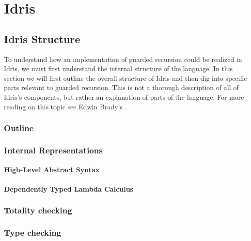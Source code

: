 \chapter{Idris}
\section{Idris Structure}
To understand how an implementation of guarded recursion could be realized in Idris, we must first understand the internal structure of the language. In this section we will first outline the overall structure of Idris and then dig into specific parts relevant to guarded recursion. This is not a thorough description of all of Idris's components, but rather an explanation of parts of the language. For more reading on this topic see Edwin Brady's .%
\subsection{Outline}
\subsection{Internal Representations}
\subsubsection{High-Level Abstract Syntax}
\subsubsection{Dependently Typed Lambda Calculus}
\subsection{Totality checking}
\subsection{Type checking}
